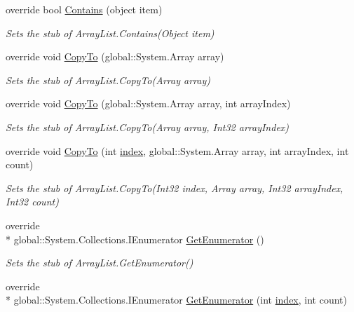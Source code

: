 \begin{DoxyCompactItemize}
override bool \hyperlink{class_system_1_1_collections_1_1_fakes_1_1_stub_array_list_a306a3cb8afc7ab7d1bbec7ba69f82051}{Contains} (object item)
\begin{DoxyCompactList}\small\item\em Sets the stub of Array\-List.\-Contains(\-Object item)\end{DoxyCompactList}\item 
override void \hyperlink{class_system_1_1_collections_1_1_fakes_1_1_stub_array_list_a2c3f9c396f344064d965ae1bed848304}{Copy\-To} (global\-::\-System.\-Array array)
\begin{DoxyCompactList}\small\item\em Sets the stub of Array\-List.\-Copy\-To(\-Array array)\end{DoxyCompactList}\item 
override void \hyperlink{class_system_1_1_collections_1_1_fakes_1_1_stub_array_list_afb66f318105d9a8e1c975e80bbfe831a}{Copy\-To} (global\-::\-System.\-Array array, int array\-Index)
\begin{DoxyCompactList}\small\item\em Sets the stub of Array\-List.\-Copy\-To(\-Array array, Int32 array\-Index)\end{DoxyCompactList}\item 
override void \hyperlink{class_system_1_1_collections_1_1_fakes_1_1_stub_array_list_a4e5e4860cd224cfe4e30795c27f51ca3}{Copy\-To} (int \hyperlink{jquery-1_810_82-vsdoc_8js_a75bb12d1f23302a9eea93a6d89d0193e}{index}, global\-::\-System.\-Array array, int array\-Index, int count)
\begin{DoxyCompactList}\small\item\em Sets the stub of Array\-List.\-Copy\-To(\-Int32 index, Array array, Int32 array\-Index, Int32 count)\end{DoxyCompactList}\item 
override \\*
global\-::\-System.\-Collections.\-I\-Enumerator \hyperlink{class_system_1_1_collections_1_1_fakes_1_1_stub_array_list_ab5faf4661296dd2768a40460f4a9ea6b}{Get\-Enumerator} ()
\begin{DoxyCompactList}\small\item\em Sets the stub of Array\-List.\-Get\-Enumerator()\end{DoxyCompactList}\item 
override \\*
global\-::\-System.\-Collections.\-I\-Enumerator \hyperlink{class_system_1_1_collections_1_1_fakes_1_1_stub_array_list_ae3644f41e7cc5c2a99750c917b694cb4}{Get\-Enumerator} (int \hyperlink{jquery-1_810_82-vsdoc_8js_a75bb12d1f23302a9eea93a6d89d0193e}{index}, int count)

\end{DoxyCompactItemize}
